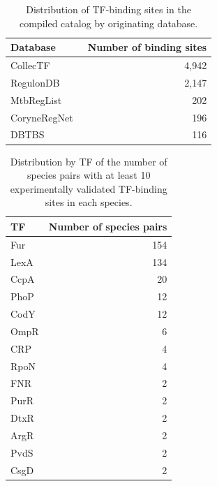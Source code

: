 \begin{table}
\caption{Distribution of TF-binding sites in the compiled catalog by
originating database.}
\label{tab:database-numbers}
\centering
\begin{tabular}{l r}
\toprule
Database & Number of binding sites \\
\midrule
CollecTF~\citep{kilic2013collectf} & 4,942 \\
RegulonDB~\citep{salgado2013regulondb} & 2,147 \\
MtbRegList~\citep{jacques2005mtbreglist} & 202 \\
CoryneRegNet~\citep{pauling2012coryneregnet} & 196 \\
DBTBS~\citep{sierro2008dbtbs} & 116 \\

\bottomrule
\end{tabular}
\end{table}

\begin{table}
\centering
\caption[Distribution by TF of the number of species pairs.]{Distribution by TF
of the number of species pairs with at least 10 experimentally validated
TF-binding sites in each species.}
\label{tab:number-of-species-pairs}

\begin{tabular}{l r}
\toprule
TF & Number of species pairs \\
\midrule
  Fur & 154 \\
  LexA & 134 \\
  CcpA & 20 \\
  PhoP & 12 \\
  CodY & 12 \\
  OmpR & 6 \\
  CRP & 4 \\
  RpoN & 4 \\
  FNR & 2 \\
  PurR & 2 \\
  DtxR & 2 \\
  ArgR & 2 \\
  PvdS & 2 \\
  CsgD & 2 \\
\bottomrule
\end{tabular}
\end{table}

